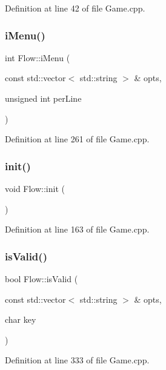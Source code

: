 Definition at line 42 of file Game.\+cpp.

\hypertarget{namespace_flow_aaa39f5888b9d17b0fc04dda6c45456b6}{}\label{namespace_flow_aaa39f5888b9d17b0fc04dda6c45456b6} 
\subsubsection{\texorpdfstring{i\+Menu()}{iMenu()}}
{\footnotesize\ttfamily int Flow\+::i\+Menu (\begin{DoxyParamCaption}\item[{const std\+::vector$<$ std\+::string $>$ \&}]{opts,  }\item[{unsigned int}]{per\+Line }\end{DoxyParamCaption})}



Definition at line 261 of file Game.\+cpp.

\hypertarget{namespace_flow_af89b31b06a629493e8b9d3797d618361}{}\label{namespace_flow_af89b31b06a629493e8b9d3797d618361} 
\subsubsection{\texorpdfstring{init()}{init()}}
{\footnotesize\ttfamily void Flow\+::init (\begin{DoxyParamCaption}{ }\end{DoxyParamCaption})}



Definition at line 163 of file Game.\+cpp.

\hypertarget{namespace_flow_ae1a1cbd4b8bf306ff4ca29275af27bf1}{}\label{namespace_flow_ae1a1cbd4b8bf306ff4ca29275af27bf1} 
\subsubsection{\texorpdfstring{is\+Valid()}{isValid()}}
{\footnotesize\ttfamily bool Flow\+::is\+Valid (\begin{DoxyParamCaption}\item[{const std\+::vector$<$ std\+::string $>$ \&}]{opts,  }\item[{char}]{key }\end{DoxyParamCaption})}



Definition at line 333 of file Game.\+cpp.

